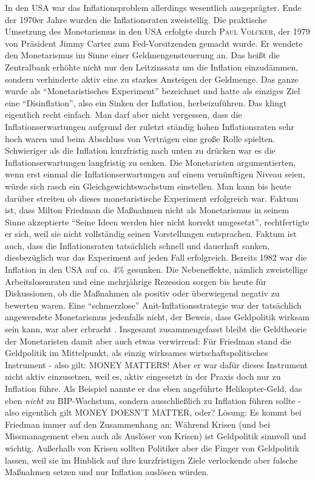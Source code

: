 In den USA war das Inflationsproblem allerdings wesentlich ausgeprägter. Ende der 1970er Jahre wurden die Inflationsraten zweistellig. Die praktische Umsetzung des Monetarismus in den USA erfolgte durch \textsc{Paul Volcker}, der 1979 von Präsident Jimmy Carter zum Fed-Vorsitzenden gemacht wurde. Er wendete den Monetarismus im Sinne einer Geldmengensteuerung an. Das heißt die Zentralbank erhöhte nicht nur den Leitzinssatz um die Inflation einzudämmen, sondern verhinderte aktiv eine zu starkes Ansteigen der Geldmenge. Das ganze wurde als "`Monetaristisches Experiment"' bezeichnet und hatte als einziges Ziel eine "`Disinflation"', also ein Sinken der Inflation, herbeizuführen. Das klingt eigentlich recht einfach. Man darf aber nicht vergessen, dass die Inflationserwartungen aufgrund der zuletzt ständig hohen Inflationsraten sehr hoch waren und beim Abschluss von Verträgen eine große Rolle spielten. Schwieriger als die Inflation kurzfristig nach unten zu drücken war es die Inflationserwartungen langfristig zu senken. Die Monetaristen argumentierten, wenn erst einmal die Inflationserwartungen auf einem vernünftigen Niveau seien, würde sich rasch ein Gleichgewichtswachstum einstellen. Man kann bis heute darüber streiten ob dieses monetaristische Experiment erfolgreich war. Faktum ist, dass Milton Friedman die Maßnahmen nicht als Monetarismus in seinem Sinne akzeptierte "`Seine Ideen werden hier nicht korrekt umgesetzt"', rechtfertigte er sich, weil sie nicht vollständig seinen Vorstellungen entsprachen\parencite{Kremer2018}. Faktum ist auch, dass die Inflationsraten tatsächlich schnell und dauerhaft sanken, diesbezüglich war das Experiment auf jeden Fall erfolgreich. Bereits 1982 war die Inflation in den USA auf ca. 4\% gesunken. Die Nebeneffekte, nämlich zweistellige Arbeitslosenraten und eine mehrjährige Rezession sorgen bis heute für Diskussionen, ob die Maßnahmen als positiv oder überwiegend negativ zu bewerten waren. Eine "`schmerzlose"' Anit-Inflationsstrategie war der tatsächlich angewendete Monetarismus jedenfalls nicht, der Beweis, dass Geldpolitik wirksam sein kann, war aber erbracht \parencite[S. 703]{Samuelson1998}.
Insgesamt zusammengefasst bleibt die Geldtheorie der Monetaristen damit aber auch etwas verwirrend: Für Friedman stand die Geldpolitik im Mittelpunkt, als einzig wirksames wirtschaftspolitisches Instrument  - also gilt: MONEY MATTERS! Aber er war dafür dieses Instrument nicht aktiv einzusetzen, weil es, aktiv eingesetzt in der Praxis doch nur zu Inflation führe. Als Beispiel nannte er das eben angeführte Helikopter-Geld, das eben \textit{nicht} zu BIP-Wachstum, sondern ausschließlich zu Inflation führen sollte - also eigentlich gilt MONEY DOESN'T MATTER, oder? Lösung: Es kommt bei Friedman immer auf den Zusammenhang an: Während Krisen (und bei Missmanagement eben auch als Auslöser von Krisen) ist Geldpolitik sinnvoll und wichtig. Außerhalb von Krisen sollten Politiker aber die Finger von Geldpolitik lassen, weil sie im Hinblick auf ihre kurzfristigen Ziele verlockende aber falsche Maßnahmen setzen und nur Inflation auslösen würden. 
